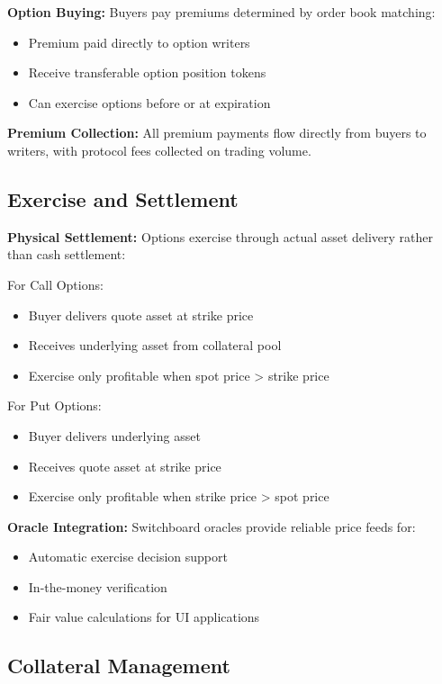 \documentclass[12pt]{article}
\begin{document}
\textbf{Option Buying:} Buyers pay premiums determined by order book matching:
\begin{itemize}
    \item Premium paid directly to option writers
    \item Receive transferable option position tokens
    \item Can exercise options before or at expiration
\end{itemize}

\textbf{Premium Collection:} All premium payments flow directly from buyers to writers, with protocol fees collected on trading volume.

\subsection{Exercise and Settlement}

\textbf{Physical Settlement:} Options exercise through actual asset delivery rather than cash settlement:

For Call Options:
\begin{itemize}
    \item Buyer delivers quote asset at strike price
    \item Receives underlying asset from collateral pool
    \item Exercise only profitable when spot price > strike price
\end{itemize}

For Put Options:
\begin{itemize}
    \item Buyer delivers underlying asset
    \item Receives quote asset at strike price
    \item Exercise only profitable when strike price > spot price
\end{itemize}

\textbf{Oracle Integration:} Switchboard oracles provide reliable price feeds for:
\begin{itemize}
    \item Automatic exercise decision support
    \item In-the-money verification
    \item Fair value calculations for UI applications
\end{itemize}

\subsection{Collateral Management}
\end{document}
